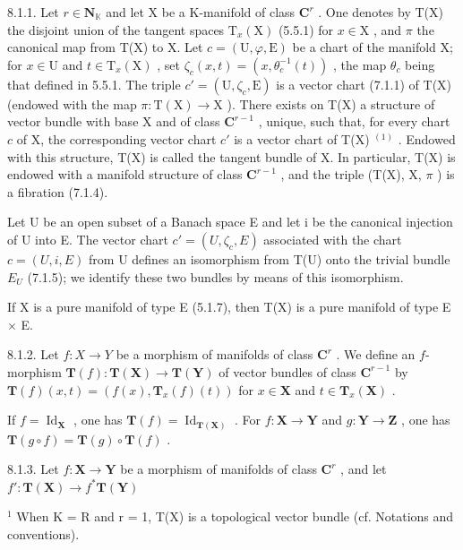 8.1.1. Let \(r \in \mathbf{N}_{\mathbb{K}}\) and let X be a K-manifold of class \(\mathbf{C}^r\) . One denotes by T(X) the disjoint union of the tangent spaces \(\mathrm{T}_x(\mathrm{X})\) (5.5.1) for \(x \in \mathrm{X}\) , and \(\pi\) the canonical map from T(X) to X. Let \(c = (\mathrm{U}, \varphi, \mathrm{E})\) be a chart of the manifold X; for \(x \in \mathrm{U}\) and \(t \in \mathrm{T}_x(\mathrm{X})\) , set \(\zeta_c(x, t) = (x, \theta_c^{-1}(t))\) , the map \(\theta_c\) being that defined in 5.5.1. The triple \(c' = (\mathrm{U}, \zeta_c, \mathrm{E})\) is a vector chart (7.1.1) of T(X) (endowed with the map \(\pi: \mathrm{T}(\mathrm{X}) \to \mathrm{X}\) ). There exists on T(X) a structure of vector bundle with base X and of class \(\mathbf{C}^{r-1}\) , unique, such that, for every chart \(c\) of X, the corresponding vector chart \(c'\) is a vector chart of T(X) \(^{(1)}\) . Endowed with this structure, T(X) is called the tangent bundle of X. In particular, T(X) is endowed with a manifold structure of class \(\mathbf{C}^{r-1}\) , and the triple (T(X), X, \(\pi\) ) is a fibration (7.1.4).

Let U be an open subset of a Banach space E and let i be the canonical injection of U into E. The vector chart \(c' = (U, \zeta_c, E)\) associated with the chart \(c = (U, i, E)\) from U defines an isomorphism from T(U) onto the trivial bundle \(E_U\) (7.1.5); we identify these two bundles by means of this isomorphism.

If X is a pure manifold of type E (5.1.7), then T(X) is a pure manifold of type E \(\times\) E.

8.1.2. Let \(f: X \to Y\) be a morphism of manifolds of class \(\mathbf{C}^r\) . We define an \(f\)-morphism \(\mathbf{T}(f): \mathbf{T}(\mathbf{X}) \to \mathbf{T}(\mathbf{Y})\) of vector bundles of class \(\mathbf{C}^{r-1}\) by \(\mathbf{T}(f)(x, t) = (f(x), \mathbf{T}_x(f)(t))\) for \(x \in \mathbf{X}\) and \(t \in \mathbf{T}_x(\mathbf{X})\) .

If \(f = \operatorname{Id}_{\mathbf{X}}\) , one has \(\mathbf{T}(f) = \operatorname{Id}_{\mathbf{T}(\mathbf{X})}\) . For \(f: \mathbf{X} \to \mathbf{Y}\) and \(g: \mathbf{Y} \to \mathbf{Z}\) , one has \(\mathbf{T}(g \circ f) = \mathbf{T}(g) \circ \mathbf{T}(f)\) .

8.1.3. Let \(f: \mathbf{X} \to \mathbf{Y}\) be a morphism of manifolds of class \(\mathbf{C}^r\) , and let \(f': \mathbf{T}(\mathbf{X}) \to f^* \mathbf{T}(\mathbf{Y})\)

\(^{1}\) When K = R and r = 1, T(X) is a topological vector bundle (cf. Notations and conventions).

